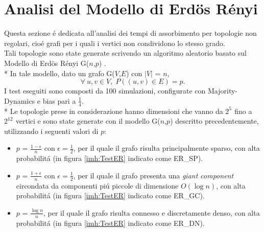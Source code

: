\documentclass[../Tesi.tex]{subfiles}
\begin{document}
\section{Analisi del Modello di Erd{\"o}s R\'enyi}
Questa sezione \'e dedicata all'analisi dei tempi di assorbimento per topologie non regolari, cio\'e grafi per i quali i vertici non condividono lo stesso grado.\\
Tali topologie sono state generate scrivendo un algoritmo aleatorio basato sul Modello di Erd{\"o}s R\'enyi G($n$,$p$) \cite{Erdos:1959:pmd}.\\*
In tale modello, dato un grafo G($V$,$E$) con $|V|$ = $n$,
\begin{equation}
    \forall \: u,v \in V,\; P((u,v) \in E)=p.
\end{equation}
I test eseguiti sono composti da 100 simulazioni, configurate con Majority-Dynamics e bias pari a $\frac{1}{4}$.\\*
Le topologie prese in considerazione hanno dimensioni che vanno da $2^{5^{\mathrm{}}}$ fino a $2^{12^{\mathrm{}}}$ vertici e sono state generate con il modello G($n$,$p$) descritto precedentemente, utilizzando i seguenti valori di $p$:
\begin{itemize}
\item $p$ = $\frac{1-\epsilon}{n}$ con $\epsilon=\frac{1}{2}$, per il quale il grafo risulta principalmente sparso, con alta probabilit\'a (in figura \ref{imh:TestER} indicato come ER\_SP).
\item $p$ = $\frac{1+\epsilon}{n}$ con $\epsilon=\frac{1}{2}$, per il quale il grafo presenta una \emph{giant component} circondata da componenti pi\'u piccole di dimensione $O(\log{}n)$, con alta probabilit\'a (in figura \ref{imh:TestER} indicato come ER\_GC).
\item $p$ = $\frac{\log{}n}{n}$, per il quale il grafo risulta connesso e discretamente denso, con alta probabilit\'a (in figura \ref{imh:TestER} indicato come ER\_DN).
\end{itemize}
\end{document}
